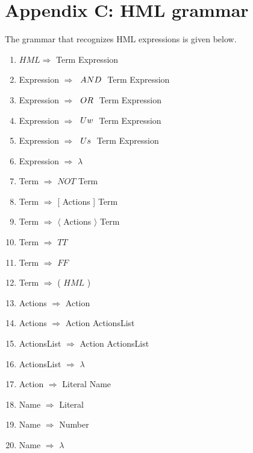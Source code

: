\section*{Appendix C: HML grammar}
The grammar that recognizes HML expressions is given below.

\begin{enumerate}
\item $HML \Rightarrow$ Term Expression
\item Expression $\Rightarrow$ $\hspace{1 mm} AND \hspace{1 mm} $ Term Expression
\item Expression $\Rightarrow$ $\hspace{1 mm} OR \hspace{1 mm} $ Term Expression
\item Expression $\Rightarrow$ $\hspace{1 mm} Uw \hspace{1 mm} $ Term Expression
\item Expression $\Rightarrow$ $\hspace{1 mm} Us \hspace{1 mm} $ Term Expression
\item Expression $\Rightarrow$ $\lambda$
\item Term $\Rightarrow$ $NOT$ Term
\item Term $\Rightarrow$ [ Actions ] Term
\item Term $\Rightarrow$ $\langle$ Actions $\rangle$ Term
\item Term $\Rightarrow$ $TT$
\item Term $\Rightarrow$ $FF$
\item Term $\Rightarrow$ ( $HML$ )
\item Actions $\Rightarrow$ Action
\item Actions $\Rightarrow$ { Action ActionsList }
\item ActionsList $\Rightarrow$ Action ActionsList
\item ActionsList $\Rightarrow$ $\lambda$
\item Action $\Rightarrow$ Literal Name
\item Name $\Rightarrow$ Literal
\item Name $\Rightarrow$ Number
\item Name $\Rightarrow$ $\lambda$

\end{enumerate}
